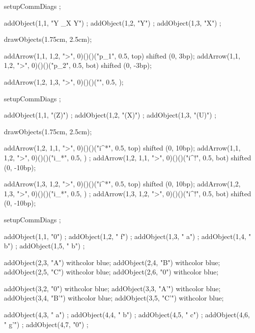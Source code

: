 \processTEXbuffer

\typebuffer

\startbuffer
\startformula{}
  setupCommDiags ;
  
  addObject(1,1, "Y \times_X Y") ;
  addObject(1,2, "Y") ;
  addObject(1,3, "X") ;
    
  drawObjects(1.75cm, 2.5cm);
  
  addArrow(1,1, 1,2, ">", 0)()()("p_1", 0.5, top) shifted (0, 3bp);
  addArrow(1,1, 1,2, ">", 0)()()("p_2", 0.5, bot) shifted (0, -3bp);
  
  addArrow(1,2, 1,3, ">", 0)()()("", 0.5, );
\stopMPcode\stopformula
\stopbuffer

\processTEXbuffer

\typebuffer

\startbuffer
\startformula{}
  setupCommDiags ;
  
  addObject(1,1, "(Z)") ;
  addObject(1,2, "(X)") ;
  addObject(1,3, "(U)") ;
    
  drawObjects(1.75cm, 2.5cm);
  
  addArrow(1,2, 1,1, ">", 0)()()("i^*", 0.5, top) shifted (0, 10bp);
  addArrow(1,1, 1,2, ">", 0)()()("i_*", 0.5,    ) ;
  addArrow(1,2, 1,1, ">", 0)()()("i^!", 0.5, bot) shifted (0, -10bp);
  
  addArrow(1,3, 1,2, ">", 0)()()("i^*", 0.5, top) shifted (0, 10bp);
  addArrow(1,2, 1,3, ">", 0)()()("i_*", 0.5,    ) ;
  addArrow(1,3, 1,2, ">", 0)()()("i^!", 0.5, bot) shifted (0, -10bp);
\stopMPcode\stopformula
\stopbuffer

\processTEXbuffer

\typebuffer

\startbuffer
\startformula{}
  setupCommDiags ;
  
  addObject(1,1, "0") ;
  addObject(1,2, "\; f") ;
  addObject(1,3, "\: a") ;
  addObject(1,4, "\: b") ;
  addObject(1,5, "\: b") ;

  addObject(2,3, "A") withcolor blue;
  addObject(2,4, "B") withcolor blue;
  addObject(2,5, "C") withcolor blue;
  addObject(2,6, "0") withcolor blue;
  
  addObject(3,2, "0")  withcolor blue;
  addObject(3,3, "A'") withcolor blue;
  addObject(3,4, "B'") withcolor blue;
  addObject(3,5, "C'") withcolor blue;

  addObject(4,3, "\: a") ;
  addObject(4,4, "\: b") ;
  addObject(4,5, "\: c") ;
  addObject(4,6, "\: g'") ;
  addObject(4,7, "0") ;
    
